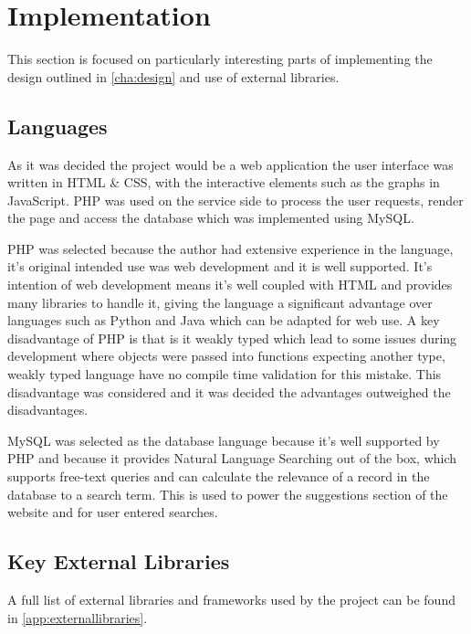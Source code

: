 \begin{comment}
Chapter 4: Implementation
The implementation details should be confined to the important, difficult or interesting aspects. Large chunks of code should be avoided, and diagrams and tables should be used to present details clearly.
\end{comment}

\chapter{Implementation}
This section is focused on particularly interesting parts of implementing the design outlined in \autoref{cha:design} and use of external libraries.

\section{Languages}
As it was decided the project would be a web application the user interface was written in HTML \& CSS, with the interactive elements such as the graphs in JavaScript. PHP was used on the service side to process the user requests, render the page and access the database which was implemented using MySQL.
 
PHP was selected because the author had extensive experience in the language, it's original intended use was web development and it is well supported. It's intention of web development means it's well coupled with HTML and provides many libraries to handle it, giving the language a significant advantage over languages such as Python and Java which can be adapted for web use. A key disadvantage of PHP is that is it weakly typed which lead to some issues during development where objects were passed into functions expecting another type, weakly typed language have no compile time validation for this mistake. This disadvantage was considered and it was decided the advantages outweighed the disadvantages.

MySQL was selected as the database language because it's well supported by PHP and because it provides Natural Language Searching out of the box, which supports free-text queries and can calculate the relevance of a record in the database to a search term. This is used to power the suggestions section of the website and for user entered searches.

\section[Key Libraries]{Key External Libraries}
A full list of external libraries and frameworks used by the project can be found in \autoref{app:externallibraries}.

